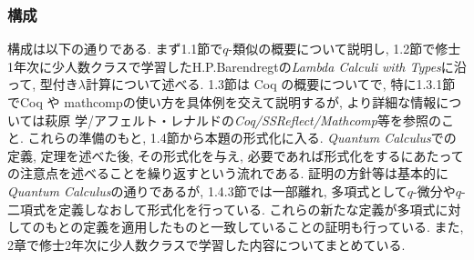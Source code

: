 \documentclass[11pt]{jsarticle}
\theoremstyle{mystyle}
\newcommand{\0}{\textbf{0}}
\begin{document}
\subsubsection*{構成}
構成は以下の通りである. 
まず1.1節で$q$-類似の概要について説明し, 
1.2節で修士1年次に少人数クラスで学習したH.P.Barendregtの{\it Lambda Calculi with Types}に沿って, 型付き$\lambda$計算について述べる. 
1.3節は Coq の概要についてで, 特に1.3.1節でCoq や mathcompの使い方を具体例を交えて説明するが, より詳細な情報については萩原 学/アフェルト・レナルドの{\it Coq/SSReflect/Mathcomp}等を参照のこと. 
これらの準備のもと, 1.4節から本題の形式化に入る. {\it Quantum Calculus}での定義, 定理を述べた後, その形式化を与え, 必要であれば形式化をするにあたっての注意点を述べることを繰り返すという流れである. 
証明の方針等は基本的に{\it Quantum Calculus}の通りであるが, 1.4.3節では一部離れ, 多項式として$q$-微分や$q$-二項式を定義しなおして形式化を行っている. これらの新たな定義が多項式に対してのもとの定義を適用したものと一致していることの証明も行っている. また, 2章で修士2年次に少人数クラスで学習した内容についてまとめている. 
\end{document}

